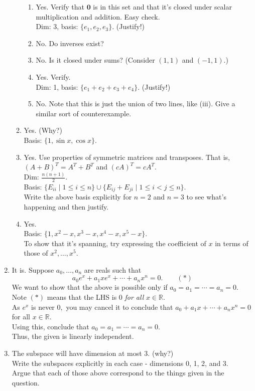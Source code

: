 \documentclass{article}
\begin{document}
\begin{enumerate}
\begin{enumerate}
\begin{enumerate}[nosep]
			\item Yes. Verify that $\mathbf{0}$ is in this set and that it's closed under scalar multiplication and addition. Easy check.\\
			Dim: 3, basis: $\{e_1, e_2, e_3\}.$ \hfill (Justify!)
			\item No. Do inverses exist?
			\item No. Is it closed under sums? (Consider $(1, 1)$ and $(-1, 1).$)
			\item Yes. Verify.\\
			Dim: 1, basis: $\{e_1 + e_2 + e_3 + e_4\}.$ \hfill (Justify!)
			\item No. Note that this is just the union of two lines, like (iii). Give a similar sort of counterexample.
		\end{enumerate}
		\item Yes. (Why?)\\
		Basis: $\{1, \sin x, \cos x\}.$
		\item Yes. Use properties of symmetric matrices and transposes. That is, $(A+B)^T = A^T + B^T$ and $(cA)^T = cA^T.$\\
		Dim: $\frac{n(n+1)}{2}.$\\
		Basis: $\{E_{ii} \mid 1 \le i \le n\} \cup \{E_{ij} + E_{ji} \mid 1 \le i < j \le n\}.$\\
		Write the above basis explicitly for $n = 2$ and $n = 3$ to see what's happening and then justify.
		\item Yes.\\
		Basis: $\{1, x^2-x, x^3-x, x^4-x, x^5-x\}.$\\
		To show that it's spanning, try expressing the coefficient of $x$ in terms of those of $x^2,\ldots, x^5.$
	\end{enumerate}
	\item It is. Suppose $a_0,\ldots, a_n$ are reals such that
	\[a_0e^x + a_1xe^x + \cdots + a_nx^n = 0. \qquad (*)\]
	We want to show that the above is possible only if $a_0 = a_1 = \cdots = a_n = 0.$\\
	Note $(*)$ means that the LHS is $0$ \emph{for all} $x \in \mathbb{R}.$\\
	As $e^x$ is never $0,$ you may cancel it to conclude that $a_0 + a_1x + \cdots + a_nx^n = 0$ for all $x \in \mathbb{R}.$\\
	Using this, conclude that $a_0 = a_1 = \cdots = a_n = 0.$\\
	Thus, the given is linearly independent.
	\item The subspace will have dimension at most 3. (why?)\\
	Write the subspaces explicitly in each case - dimensions 0, 1, 2, and 3.\\
	Argue that each of those above correspond to the things given in the question.  
\end{enumerate}
\end{document}

